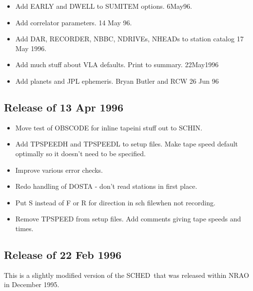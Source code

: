 \documentclass{report}
\newcommand{\schedb}{{\sc SCHED~}}
\begin{document}
\begin{itemize}
\item Add EARLY and DWELL to SUMITEM options.  6May96.

\item Add correlator parameters.  14 May 96.

\item Add DAR, RECORDER, NBBC, NDRIVEs, NHEADs to station catalog
      17 May 1996.

\item Add much stuff about VLA defaults.  Print to summary.
      22May1996

\item Add planets and JPL ephemeris.  Bryan Butler and RCW 26 Jun 96

\end{itemize}

\subsection{\label{SSSEC:APR96}Release of 13 Apr 1996}

\begin{itemize}

\item Move test of OBSCODE for inline tapeini stuff out to SCHIN.

\item Add TPSPEEDH and TPSPEEDL to setup files.  Make tape speed
default optimally so it doesn't need to be specified.

\item Improve various error checks.

\item Redo handling of DOSTA - don't read stations in first place.

\item Put S instead of F or R for direction in sch filewhen not
recording.

\item Remove TPSPEED from setup files.  Add comments giving tape
speeds and times.

\end{itemize}

\subsection{\label{SSSEC:FEB96}Release of 22 Feb 1996}

This is a slightly modified version of the \schedb that was
released within NRAO in December 1995.
\end{document}
